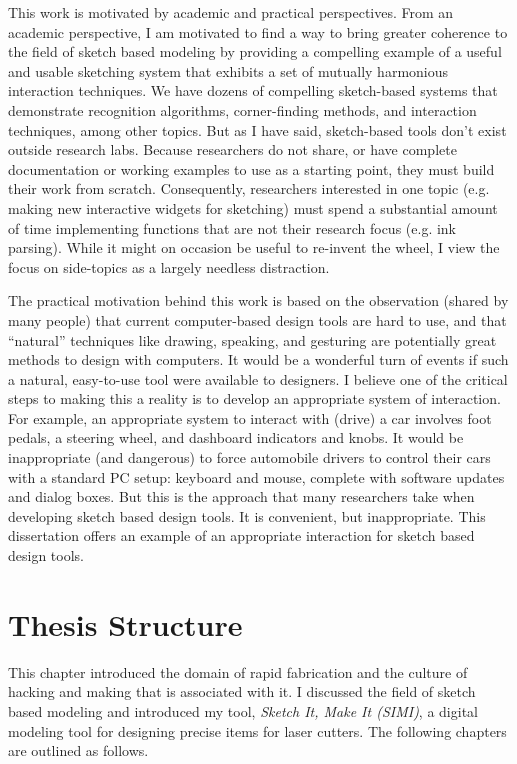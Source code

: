 This work is motivated by academic and practical perspectives. From an
academic perspective, I am motivated to find a way to bring greater
coherence to the field of sketch based modeling by providing a
compelling example of a useful and usable sketching system that
exhibits a set of mutually harmonious interaction techniques. We have
dozens of compelling sketch-based systems that demonstrate recognition
algorithms, corner-finding methods, and interaction techniques, among
other topics. But as I have said, sketch-based tools don't exist
outside research labs. Because researchers do not share, or have
complete documentation or working examples to use as a starting point,
they must build their work from scratch. Consequently, researchers
interested in one topic (e.g. making new interactive widgets for
sketching) must spend a substantial amount of time implementing
functions that are not their research focus (e.g. ink parsing). While
it might on occasion be useful to re-invent the wheel, I view the
focus on side-topics as a largely needless distraction.

The practical motivation behind this work is based on the observation
(shared by many people) that current computer-based design tools are
hard to use, and that ``natural'' techniques like drawing, speaking,
and gesturing are potentially great methods to design with
computers. It would be a wonderful turn of events if such a natural,
easy-to-use tool were available to designers. I believe one of the
critical steps to making this a reality is to develop an appropriate
system of interaction. For example, an appropriate system to interact
with (drive) a car involves foot pedals, a steering wheel, and
dashboard indicators and knobs. It would be inappropriate (and
dangerous) to force automobile drivers to control their cars with a
standard PC setup: keyboard and mouse, complete with software updates
and dialog boxes. But this is the approach that many researchers take
when developing sketch based design tools. It is convenient, but
inappropriate. This dissertation offers an example of an appropriate
interaction for sketch based design tools.

\section{Thesis Structure}

This chapter introduced the domain of rapid fabrication and the
culture of hacking and making that is associated with it.  I discussed
the field of sketch based modeling and introduced my tool,
\textit{Sketch It, Make It (SIMI)}, a digital modeling tool for
designing precise items for laser cutters. The following chapters are
outlined as follows.


